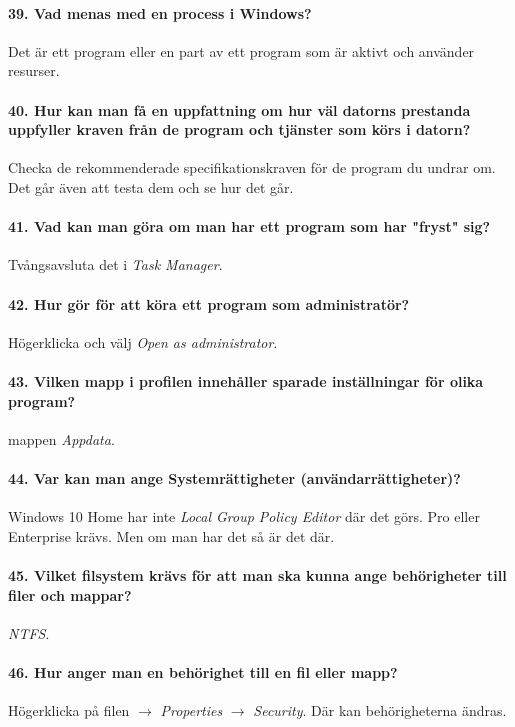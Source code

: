 \paragraph{39. Vad menas med en process i Windows?}
Det är ett program eller en part av ett program som är aktivt och använder resurser.

\paragraph{40. Hur kan man få en uppfattning om hur väl datorns prestanda uppfyller kraven från de program och tjänster som körs i datorn?}
Checka de rekommenderade specifikationskraven för de program du undrar om. Det går även att testa dem och se hur det går.

\paragraph{41. Vad kan man göra om man har ett program som har "fryst" sig?}
Tvångsavsluta det i \textit{Task Manager}.

\paragraph{42. Hur gör för att köra ett program som administratör?}
Högerklicka och välj \textit{Open as administrator}.

\paragraph{43. Vilken mapp i profilen innehåller sparade inställningar för olika program?}
mappen \textit{Appdata}.

\paragraph{44. Var kan man ange Systemrättigheter (användarrättigheter)?}
Windows 10 Home har inte \textit{Local Group Policy Editor} där det görs. Pro eller Enterprise krävs. Men om man har det så är det där.

\paragraph{45. Vilket filsystem krävs för att man ska kunna ange behörigheter till filer och mappar?}
\textit{NTFS}.

\paragraph{46. Hur anger man en behörighet till en fil eller mapp?} Högerklicka på filen $\rightarrow$ \textit{Properties} $\rightarrow$ \textit{Security}. Där kan behörigheterna ändras.
 
